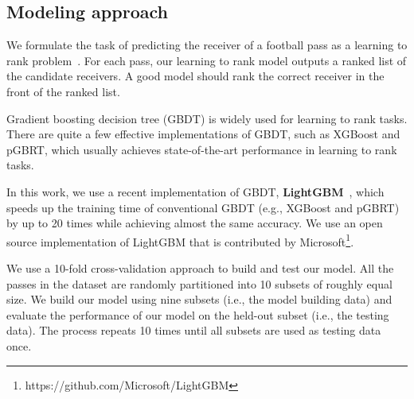 

\subsection{Modeling approach}

We formulate the task of predicting the receiver of a football pass as a learning to rank problem~\cite{liu2009learning}. 
For each pass, our learning to rank model outputs a ranked list of the candidate receivers. 
A good model should rank the correct receiver in the front of the ranked list.

Gradient boosting decision tree (GBDT) is widely used for learning to rank tasks.
There are quite a few effective implementations of GBDT, such as XGBoost and pGBRT, which usually achieves state-of-the-art performance in learning to rank tasks.

In this work, we use a recent implementation of GBDT, \textbf{LightGBM}~\cite{NIPS2017_6907}, which speeds up the training time of conventional GBDT (e.g., XGBoost and pGBRT) by up to 20 times while achieving almost the same accuracy. 
We use an open source implementation of LightGBM that is contributed by Microsoft\footnote{https://github.com/Microsoft/LightGBM}.

We use a 10-fold cross-validation approach to build and test our model. 
All the passes in the dataset are randomly partitioned into 10 subsets of roughly equal size. 
We build our model using nine subsets (i.e., the model building data) and evaluate the performance of our model on the held-out subset (i.e., the testing data).
The process repeats 10 times until all subsets are used as testing data once.

